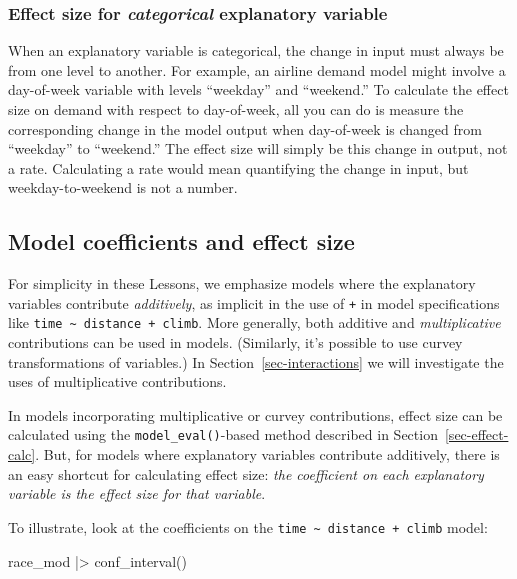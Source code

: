\documentclass[
  letterpaper,
  DIV=11,
  numbers=noendperiod,
  oneside]{scrartcl}
\newenvironment{Shaded}{\begin{snugshade}}{\end{snugshade}}
\newcommand{\FunctionTok}[1]{\textcolor[rgb]{0.28,0.35,0.67}{#1}}
\newcommand{\NormalTok}[1]{\textcolor[rgb]{0.00,0.23,0.31}{#1}}
\newcommand{\SpecialCharTok}[1]{\textcolor[rgb]{0.37,0.37,0.37}{#1}}
\begin{document}
\begin{tcolorbox}
\end{tcolorbox}

\subsubsection{\texorpdfstring{Effect size for \emph{categorical}
explanatory
variable}{Effect size for categorical explanatory variable}}\label{effect-size-for-categorical-explanatory-variable}

When an explanatory variable is categorical, the change in input must
always be from one level to another. For example, an airline demand
model might involve a day-of-week variable with levels ``weekday'' and
``weekend.'' To calculate the effect size on demand with respect to
day-of-week, all you can do is measure the corresponding change in the
model output when day-of-week is changed from ``weekday'' to
``weekend.'' The effect size will simply be this change in output, not a
rate. Calculating a rate would mean quantifying the change in input, but
weekday-to-weekend is not a number.

\subsection{Model coefficients and effect
size}\label{model-coefficients-and-effect-size}

For simplicity in these Lessons, we emphasize models where the
explanatory variables contribute \emph{additively}, as implicit in the
use of \texttt{+} in model specifications like
\texttt{time\ \textasciitilde{}\ distance\ +\ climb}. More generally,
both additive and \emph{multiplicative} contributions can be used in
models. (Similarly, it's possible to use curvey transformations of
variables.) In Section~\ref{sec-interactions} we will investigate the
uses of multiplicative contributions.

In models incorporating multiplicative or curvey contributions, effect
size can be calculated using the \texttt{model\_eval()}-based method
described in Section~\ref{sec-effect-calc}. But, for models where
explanatory variables contribute additively, there is an easy shortcut
for calculating effect size: \emph{the coefficient on each explanatory
variable is the effect size for that variable}.

To illustrate, look at the coefficients on the
\texttt{time\ \textasciitilde{}\ distance\ +\ climb} model:

\begin{Shaded}
\begin{Highlighting}[]
\NormalTok{race\_mod }\SpecialCharTok{|\textgreater{}} \FunctionTok{conf\_interval}\NormalTok{()}
\end{Highlighting}
\end{Shaded}
\end{document}
